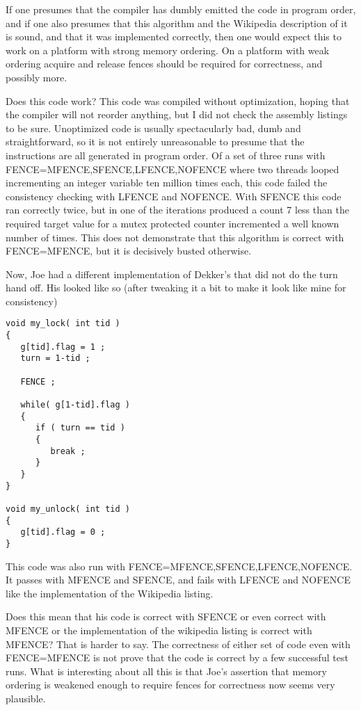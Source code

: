 If one presumes that the compiler has dumbly emitted the code in program order, and if one also presumes that this algorithm and the Wikipedia description of it is sound, and that it was implemented correctly, then one would expect this to work on a platform with strong memory ordering.  On a platform with weak ordering acquire and release fences should be required for correctness, and possibly more.

Does this code work?  This code was compiled without optimization, hoping that the compiler will not reorder anything, but I did not check the assembly listings to be sure.  Unoptimized code is usually spectacularly bad, dumb and straightforward, so it is not entirely unreasonable to presume that the instructions are all generated in program order.  Of a set of three runs with FENCE=MFENCE,SFENCE,LFENCE,NOFENCE where two threads looped incrementing an integer variable ten million times each, this code failed the consistency checking with LFENCE and NOFENCE.  With SFENCE this code ran correctly twice, but in one of the iterations produced a count 7 less than the required target value for a mutex protected counter incremented a well known number of times.  This does not demonstrate that this algorithm is correct with FENCE=MFENCE, but it is decisively busted otherwise.

Now, Joe had a different implementation of Dekker's that did not do the turn hand off.  His looked like so (after tweaking it a bit to make it look like mine for consistency)

\begin{lstlisting}
void my_lock( int tid )
{
   g[tid].flag = 1 ;
   turn = 1-tid ;

   FENCE ;

   while( g[1-tid].flag )
   {
      if ( turn == tid )
      {
         break ;
      }
   }
}

void my_unlock( int tid )
{
   g[tid].flag = 0 ;
}
\end{lstlisting}

This code was also run with FENCE=MFENCE,SFENCE,LFENCE,NOFENCE.  It passes with MFENCE and SFENCE, and fails with LFENCE and NOFENCE like the implementation of the Wikipedia listing.

Does this mean that his code is correct with SFENCE or even correct with MFENCE or the implementation of the wikipedia listing is correct with MFENCE?  That is harder to say.  The correctness of either set of code even with FENCE=MFENCE is not prove that the code is correct by a few successful test runs.  What is interesting about all this is that Joe's assertion that memory ordering is weakened enough to require fences for correctness now seems very plausible.

